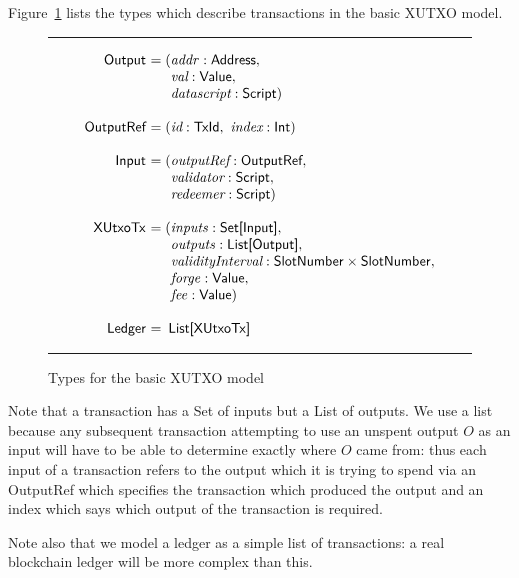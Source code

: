 \documentclass[a4paper]{article}
\renewcommand{\i}{\textit}  %
\newcommand{\s}{\textsf}  %
\theoremstyle{definition}  %
\newenvironment{arraydefs}[1]{\setlength{\arraycolsep}{0pt}\begin{array}{#1}}{\end{array}}
\newcommand\rfskip{7pt}
\newenvironment{ruledfigure}[1]{\begin{figure}[#1]\hrule\vspace{\rfskip}}{\vspace{\rfskip}\hrule\end{figure}}
\newcommand{\mi}[1]{\ensuremath{\mathit{#1}}}
\newcommand{\inputs}{\mi{inputs}}
\newcommand{\outputs}{\mi{outputs}}
\newcommand{\forge}{\mi{forge}}
\newcommand{\fee}{\mi{fee}}
\newcommand{\addr}{\mi{addr}}
\newcommand{\msf}[1]{\ensuremath{\mathsf{#1}}}
\newcommand{\slotnum}{\msf{SlotNumber}}
\newcommand{\xutxotx}{\msf{XUtxoTx}}
\begin{document}
\noindent Figure~\ref{fig:basic-xutxo-types} lists the types which
describe transactions in the basic XUTXO model.


\begin{ruledfigure}{H}
  \[
  \begin{arraydefs}{rll}
    
    \s{Output } &= (&\addr: \s{Address},\\
    && \i{val}: \s{Value},\\
    &&  \i{datascript}: \s{Script})\\
    \\
    \s{OutputRef } &= (&\i{id}: \s{TxId},\ \i{index}: \s{Int})\\
    \\
    \s{Input } & = (&\i{outputRef}: \s{OutputRef},\\
                 && \i{validator}: \s{Script},\\
                 && \i{redeemer}: \s{Script})\\
     \\
     \xutxotx\s{ } &= (&\inputs: \s{Set[Input]},\\
     &&\outputs: \s{List[Output]},\\
     &&\i{validityInterval}: \slotnum \times \slotnum,\\
     &&\forge: \s{Value}, \\
     && \fee: \s{Value})\\
     \\
     \s{Ledger } &=&\!\s{List[}\xutxotx\s{]}\\
  \end{arraydefs}
  \]
  \caption{Types for the basic XUTXO model}
  \label{fig:basic-xutxo-types}
\end{ruledfigure}

\noindent Note that a transaction has a \textsf{Set} of inputs but a
\textsf{List} of outputs. We use a list because any subsequent
transaction attempting to use an unspent output $O$ as an input will
have to be able to determine exactly where $O$ came from: thus each
input of a transaction refers to the output which it is trying to
spend via an \s{OutputRef} which specifies the transaction which
produced the output and an index which says which output of the
transaction is required.

Note also that we model a ledger as a simple list of transactions:
a real blockchain ledger will be more complex than this.
\vspace{10pt}
\end{document}
